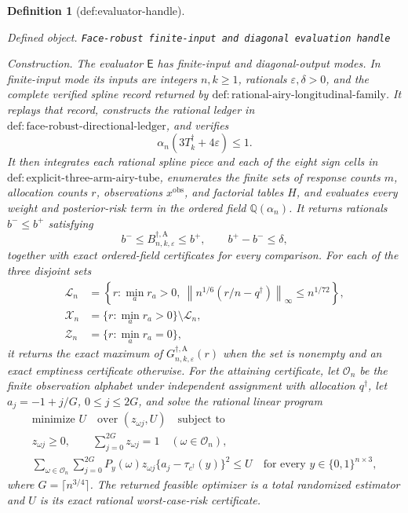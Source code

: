 \documentclass{article}
\newtheorem{definition}{Definition}
\begin{document}
\begin{definition}[def:evaluator-handle]\label{def:evaluator-handle}
\par\smallskip\noindent\emph{Defined object.} \texttt{Face-\allowbreak{}robust finite-\allowbreak{}input and diagonal evaluation handle}
\par\smallskip\noindent\emph{Construction.} The evaluator \(\mathsf E\) has finite-input and diagonal-output modes.  In finite-input mode its inputs are integers \(n,k\ge1\), rationals \(\varepsilon,\delta>0\), and the complete verified spline record returned by
\(\mathrm{def:rational\text{-}airy\text{-}longitudinal\text{-}family}\).  It replays that record, constructs the rational ledger in
\(\mathrm{def:face\text{-}robust\text{-}directional\text{-}ledger}\), and verifies
\[
\alpha_n(3T_k^\dagger+4\varepsilon)\le1.
\]
It then integrates each rational spline piece and each of the eight sign cells in
\(\mathrm{def:explicit\text{-}three\text{-}arm\text{-}airy\text{-}tube}\), enumerates the finite sets of response counts \(m\), allocation counts \(r\), observations \(x^{\mathrm{obs}}\), and factorial tables \(H\), and evaluates every weight and posterior-risk term in the ordered field \(\mathbb Q(\alpha_n)\).  It returns rationals \(b^-\le b^+\) satisfying
\[
b^-\le B_{n,k,\varepsilon}^{\dagger,\mathrm A}\le b^+,
\qquad b^+-b^-\le\delta,
\]
together with exact ordered-field certificates for every comparison.  For each of the three disjoint sets
\[
\begin{aligned}
\mathcal L_n&=\left\{r:\min_a r_a>0,
\ \left\|n^{1/6}(r/n-q^\dagger)\right\|_\infty
\le n^{1/72}\right\},\\
\mathcal X_n&=\{r:\min_a r_a>0\}\setminus\mathcal L_n,\\
\mathcal Z_n&=\{r:\min_a r_a=0\},
\end{aligned}
\]
it returns the exact maximum of
\(G_{n,k,\varepsilon}^{\dagger,\mathrm A}(r)\) when the set is nonempty and an exact emptiness certificate otherwise.
For the attaining certificate, let \(\mathcal O_n\) be the finite observation alphabet under independent assignment with allocation \(q^\dagger\), let
\(a_j=-1+j/G\), \(0\le j\le2G\), and solve the rational linear program
\[
\begin{gathered}
\text{minimize }U\quad\text{over }(z_{\omega j},U)\quad\text{subject to}\\
z_{\omega j}\ge0,
\qquad \sum_{j=0}^{2G}z_{\omega j}=1
\quad(\omega\in\mathcal O_n),\\
\sum_{\omega\in\mathcal O_n}\sum_{j=0}^{2G}
P_y(\omega)z_{\omega j}
\{a_j-\tau_{c^\dagger}(y)\}^2\le U
\quad\text{for every }y\in\{0,1\}^{n\times3},
\end{gathered}
\]
where \(G=\lceil n^{3/4}\rceil\).  The returned feasible optimizer is a total randomized estimator and \(U\) is its exact rational worst-case-risk certificate.


\end{definition}
\end{document}
